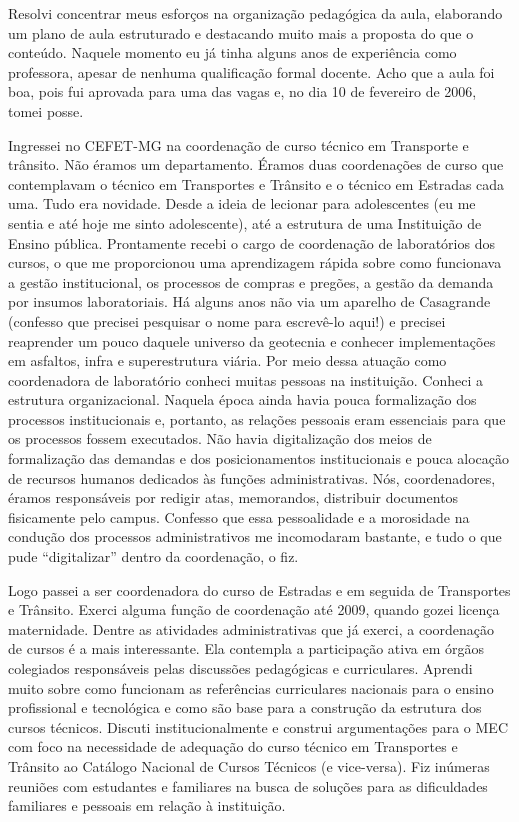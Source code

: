 \documentclass[
]{book}
\begin{document}
Resolvi concentrar meus esforços na organização pedagógica da aula,
elaborando um plano de aula estruturado e destacando muito mais a
proposta do que o conteúdo. Naquele momento eu já tinha alguns anos de
experiência como professora, apesar de nenhuma qualificação formal
docente. Acho que a aula foi boa, pois fui aprovada para uma das vagas
e, no dia 10 de fevereiro de 2006, tomei posse.

Ingressei no CEFET-MG na coordenação de curso técnico em Transporte e
trânsito. Não éramos um departamento. Éramos duas coordenações de curso
que contemplavam o técnico em Transportes e Trânsito e o técnico em
Estradas cada uma. Tudo era novidade. Desde a ideia de lecionar para
adolescentes (eu me sentia e até hoje me sinto adolescente), até a
estrutura de uma Instituição de Ensino pública. Prontamente recebi o
cargo de coordenação de laboratórios dos cursos, o que me proporcionou
uma aprendizagem rápida sobre como funcionava a gestão institucional, os
processos de compras e pregões, a gestão da demanda por insumos
laboratoriais. Há alguns anos não via um aparelho de Casagrande
(confesso que precisei pesquisar o nome para escrevê-lo aqui!) e
precisei reaprender um pouco daquele universo da geotecnia e conhecer
implementações em asfaltos, infra e superestrutura viária. Por meio
dessa atuação como coordenadora de laboratório conheci muitas pessoas na
instituição. Conheci a estrutura organizacional. Naquela época ainda
havia pouca formalização dos processos institucionais e, portanto, as
relações pessoais eram essenciais para que os processos fossem
executados. Não havia digitalização dos meios de formalização das
demandas e dos posicionamentos institucionais e pouca alocação de
recursos humanos dedicados às funções administrativas. Nós,
coordenadores, éramos responsáveis por redigir atas, memorandos,
distribuir documentos fisicamente pelo campus. Confesso que essa
pessoalidade e a morosidade na condução dos processos administrativos me
incomodaram bastante, e tudo o que pude ``digitalizar'' dentro da
coordenação, o fiz.

Logo passei a ser coordenadora do curso de Estradas e em seguida de
Transportes e Trânsito. Exerci alguma função de coordenação até 2009,
quando gozei licença maternidade. Dentre as atividades administrativas
que já exerci, a coordenação de cursos é a mais interessante. Ela
contempla a participação ativa em órgãos colegiados responsáveis pelas
discussões pedagógicas e curriculares. Aprendi muito sobre como
funcionam as referências curriculares nacionais para o ensino
profissional e tecnológica e como são base para a construção da
estrutura dos cursos técnicos. Discuti institucionalmente e construi
argumentações para o MEC com foco na necessidade de adequação do curso
técnico em Transportes e Trânsito ao Catálogo Nacional de Cursos
Técnicos (e vice-versa). Fiz inúmeras reuniões com estudantes e
familiares na busca de soluções para as dificuldades familiares e
pessoais em relação à instituição.
\end{document}
